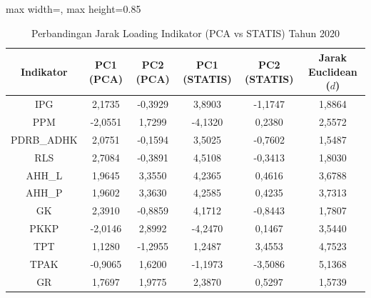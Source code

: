 \begin{table}[H]
\centering
\caption{Perbandingan Jarak Loading Indikator (PCA vs STATIS) Tahun 2020} \label{tab:app1jarak_loading_2020}
\begin{adjustbox}{max width=\textwidth, max height=0.85\textheight}
\begin{tabular}{|c|c|c|c|c|c|}
\hline
\textbf{Indikator} & \textbf{PC1 (PCA)} & \textbf{PC2 (PCA)} & \textbf{PC1 (STATIS)} & \textbf{PC2 (STATIS)} & \textbf{Jarak Euclidean ($d$)} \\
\hline
IPG & 2,1735 & -0,3929 & 3,8903 & -1,1747 & 1,8864 \\
PPM & -2,0551 & 1,7299 & -4,1320 & 0,2380 & 2,5572 \\
PDRB\_ADHK & 2,0751 & -0,1594 & 3,5025 & -0,7602 & 1,5487 \\
RLS & 2,7084 & -0,3891 & 4,5108 & -0,3413 & 1,8030 \\
AHH\_L & 1,9645 & 3,3550 & 4,2365 & 0,4616 & 3,6788 \\
AHH\_P & 1,9602 & 3,3630 & 4,2585 & 0,4235 & 3,7313 \\
GK & 2,3910 & -0,8859 & 4,1712 & -0,8443 & 1,7807 \\
PKKP & -2,0146 & 2,8992 & -4,2470 & 0,1467 & 3,5440 \\
TPT & 1,1280 & -1,2955 & 1,2487 & 3,4553 & 4,7523 \\
TPAK & -0,9065 & 1,6200 & -1,1973 & -3,5086 & 5,1368 \\
GR & 1,7697 & 1,9775 & 2,3870 & 0,5297 & 1,5739 \\
\hline
\end{tabular}
\end{adjustbox}
\end{table}
